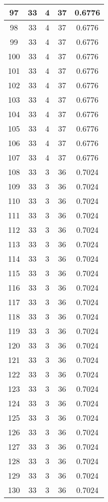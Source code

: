 \documentclass[letterpaper, 12pt]{article}
\begin{document}
\begin{longtable}{|c|c|c|c|c|}
\hline
97 & 33 & 4 & 37 & 0.6776 \\
\hline
98 & 33 & 4 & 37 & 0.6776 \\
\hline
99 & 33 & 4 & 37 & 0.6776 \\
\hline
100 & 33 & 4 & 37 & 0.6776 \\
\hline
101 & 33 & 4 & 37 & 0.6776 \\
\hline
102 & 33 & 4 & 37 & 0.6776 \\
\hline
103 & 33 & 4 & 37 & 0.6776 \\
\hline
104 & 33 & 4 & 37 & 0.6776 \\
\hline
105 & 33 & 4 & 37 & 0.6776 \\
\hline
106 & 33 & 4 & 37 & 0.6776 \\
\hline
107 & 33 & 4 & 37 & 0.6776 \\
\hline
108 & 33 & 3 & 36 & 0.7024 \\
\hline
109 & 33 & 3 & 36 & 0.7024 \\
\hline
110 & 33 & 3 & 36 & 0.7024 \\
\hline
111 & 33 & 3 & 36 & 0.7024 \\
\hline
112 & 33 & 3 & 36 & 0.7024 \\
\hline
113 & 33 & 3 & 36 & 0.7024 \\
\hline
114 & 33 & 3 & 36 & 0.7024 \\
\hline
115 & 33 & 3 & 36 & 0.7024 \\
\hline
116 & 33 & 3 & 36 & 0.7024 \\
\hline
117 & 33 & 3 & 36 & 0.7024 \\
\hline
118 & 33 & 3 & 36 & 0.7024 \\
\hline
119 & 33 & 3 & 36 & 0.7024 \\
\hline
120 & 33 & 3 & 36 & 0.7024 \\
\hline
121 & 33 & 3 & 36 & 0.7024 \\
\hline
122 & 33 & 3 & 36 & 0.7024 \\
\hline
123 & 33 & 3 & 36 & 0.7024 \\
\hline
124 & 33 & 3 & 36 & 0.7024 \\
\hline
125 & 33 & 3 & 36 & 0.7024 \\
\hline
126 & 33 & 3 & 36 & 0.7024 \\
\hline
127 & 33 & 3 & 36 & 0.7024 \\
\hline
128 & 33 & 3 & 36 & 0.7024 \\
\hline
129 & 33 & 3 & 36 & 0.7024 \\
\hline
130 & 33 & 3 & 36 & 0.7024 \\

\end{longtable}
\end{document}
